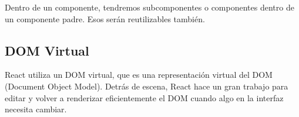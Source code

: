 Dentro de un componente, tendremos subcomponentes o componentes dentro de un componente padre. Esos serán reutilizables también.
\vspace{0.8cm}




\subsection{DOM Virtual}
React utiliza un DOM virtual, que es una representación virtual del DOM (Document Object Model). Detrás de escena, React hace un gran trabajo para editar y volver a renderizar eficientemente el DOM cuando algo en la interfaz necesita cambiar.